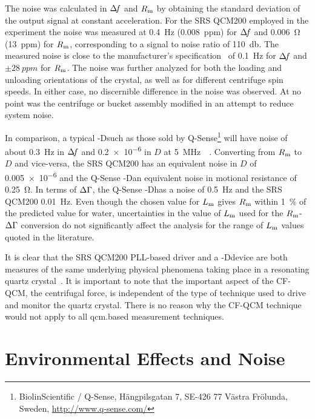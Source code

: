 The noise was calculated in $\Delta\!f$ and $R_\mathrm{m}$ by obtaining the standard
deviation of the output signal at constant acceleration.  For the SRS
QCM200 employed in the experiment the noise was measured at
\SI{0.4}{\hertz} (\SI{0.008}{ppm}) for $\Delta\!f$ and \SI{0.006}{\ohm}
(\SI{13}{ppm}) for $R_\mathrm{m}$, corresponding to a signal to noise ratio of
\SI{110}{\decibel}.  The measured noise is close to the manufacturer's
specification~\cite{srsqcm200manual} of \SI{0.1}{\hertz} for $\Delta\!f$ and
$\pm\SI{28}{ppm}$ for $R_\mathrm{m}$.  The noise was further analyzed for both the
loading and unloading orientations of the crystal, as well as for different
centrifuge spin speeds.  In either case, no discernible difference in the
noise was observed.  At no point was the centrifuge or bucket assembly
modified in an attempt to reduce system noise.

In comparison, a typical \QCM-Dsuch as those sold by
Q-Sense\footnote{BiolinScientific / Q-Sense, Hängpilsgatan 7, SE-426 77
Västra Frölunda, Sweden,  \url{http://www.q-sense.com/}} will have noise of
about \SI{0.3}{\hertz} in $\Delta\!f$ and \num{0.2e-6} in $D$ at
\SI{5}{\mega\hertz}~\cite{su2005comparison}~\cite{peh2007understanding}.
Converting from $R_\mathrm{m}$ to $D$ and vice-versa, the SRS QCM200 has an
equivalent noise in $D$ of \num{0.005e-6} and the Q-Sense \QCM-Dan
equivalent noise in motional resistance of \SI{0.25}{\ohm}.  In terms of
$\Delta\Gamma$, the Q-Sense \QCM-Dhas a noise of \SI{0.5}{\hertz} and the SRS QCM200
\SI{0.01}{\hertz}.  Even though the chosen value for $L_\mathrm{m}$ gives $R_\mathrm{m}$
within \SI{1}{\percent} of the predicted value for water, uncertainties in
the value of $L_\mathrm{m}$ used for the $R_\mathrm{m}$-$\Delta\Gamma$ conversion do not significantly
affect the analysis for the range of $L_\mathrm{m}$ values quoted in the literature.

It is clear that the SRS QCM200 PLL-based driver and a \QCM-Ddevice are
both measures of the same underlying physical phenomena taking place in a
resonating quartz crystal~\cite{geelhood2002transient}.  It is important to
note that the important aspect of the CF-QCM, the centrifugal force, is
independent of the type of technique used to drive and monitor the quartz
crystal.  There is no reason why the CF-QCM technique would not apply to
all \gls{qcm}.based measurement techniques.

\section{Environmental Effects and Noise}

